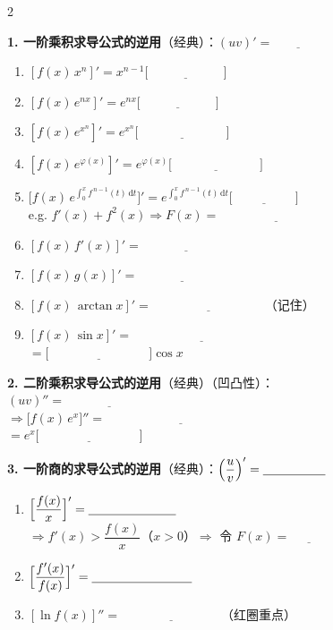 \documentclass[a4paper,12pt]{article}
\newcommand{\blank}[1][3em]{\underline{\hspace{#1}}}
\begin{document}
\begin{multicols}{2}

\textbf{1. 一阶乘积求导公式的逆用}（经典）：$(uv)' = \blank[4em]$
\begin{enumerate}[label=\alph*., leftmargin=1.8em, itemsep=1.7em]
    \item $[f(x)\,x^{n}]' = x^{n-1}\bigl[\blank[6em]\bigr]$
    \item $[f(x)\,e^{nx}]' = e^{nx}\bigl[\blank[6em]\bigr]$
    \item $[f(x)\,e^{x^{n}}]' = e^{x^{n}}\bigl[\blank[7em]\bigr]$
    \item $[f(x)\,e^{\varphi(x)}]' = e^{\varphi(x)}\bigl[\blank[7em]\bigr]$
    \item $\bigl[f(x)\,e^{\int_{0}^{x} f^{\,n-1}(t)\,\mathrm{d}t}\bigr]' = e^{\int_{0}^{x} f^{\,n-1}(t)\,\mathrm{d}t}\bigl[\blank[5em]\bigr]$
          \\e.g. $f'(x) + f^{2}(x) \Rightarrow F(x) = \blank[9em]$
    \item $[f(x)\,f'(x)]' = \blank[7em]$
    \item $[f(x)\,g(x)]' = \blank[7em]$
    \item $[f(x)\,\arctan x]' = \blank[9em]$\quad（记住）
    \item $[f(x)\,\sin x]' = \blank[11em]$
          \\$= \bigl[\blank[8em]\bigr]\cos x$
\end{enumerate}

\vspace{0.5em}

\textbf{2. 二阶乘积求导公式的逆用}（经典）（凹凸性）：\\
$(uv)'' = \blank[7em]$
\\$\Rightarrow \bigl[f(x)\,e^{x}\bigr]'' = \blank[12em]$
\\$= e^{x}\bigl[\blank[8em]\bigr]$

\vspace{1em}

\textbf{3. 一阶商的求导公式的逆用}（经典）：$\Bigl(\dfrac{u}{v}\Bigr)' = \blank[5em]$
\begin{enumerate}[label=\alph*., leftmargin=1.8em, itemsep=1.7em]
    \item $\Bigl[\dfrac{f(x)}{x}\Bigr]' = \blank[7em]$
          \\$\Rightarrow f'(x) > \dfrac{f(x)}{x}$（$x > 0$）$\Rightarrow$ 令 $F(x) = \blank[3em]$
    \item $\Bigl[\dfrac{f'(x)}{f(x)}\Bigr]' = \blank[8em]$
    \item $[\ln f(x)]'' = \blank[8em]$\quad（红圈重点）
\end{enumerate}


\end{multicols}
\end{document}
